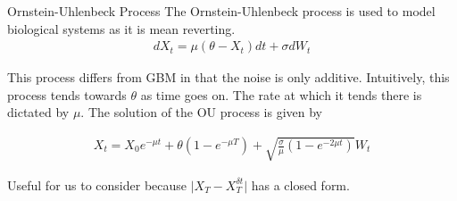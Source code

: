 \documentclass[]{beamer}
\begin{document}
\begin{frame}{Ornstein-Uhlenbeck Process}
  The Ornstein-Uhlenbeck process is used to model biological systems as it is mean reverting.
  \begin{gather*}
    d X_t = \mu(\theta-X_t) dt + \sigma dW_t
  \end{gather*}

  This process differs from GBM in that the noise is only additive. Intuitively, this process tends towards $\theta$ as time goes on. The rate at which it tends there is dictated by $\mu$. The solution of the OU process is given by

  \begin{gather*}
    X_t = X_0 e^{-\mu t}+ \theta(1-e^{-\mu T}) + \sqrt{\frac{\sigma}{\mu} (1-e^{-2 \mu t})} W_t
  \end{gather*}

  Useful for us to consider because $\lvert X_T - X_T^{\delta t} \rvert$ has a closed form.
\end{frame}
\end{document}

